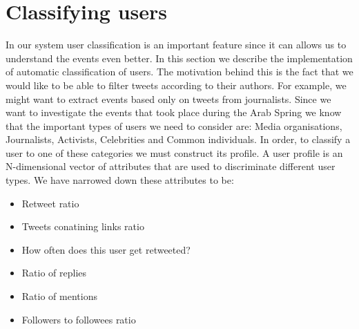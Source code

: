 \section{Classifying users}
In our system user classification is an important feature since it can allows us to understand the events even better. In this section we describe the implementation of automatic classification of users. The motivation behind this is the fact that we would like to be able to filter tweets according to their authors. For example, we might want to extract events based only on tweets from journalists. Since we want to investigate the events that took place during the Arab Spring we know that the important types of users we need to consider are: Media organisations, Journalists, Activists, Celebrities and Common individuals. In order, to classify a user to one of these categories we must construct its profile. A user profile is an N-dimensional vector of attributes that are used to discriminate different user types. We have narrowed down these attributes to be:
\begin{itemize}
  \item Retweet ratio
  \item Tweets conatining links ratio
  \item How often does this user get retweeted?
  \item Ratio of replies
  \item Ratio of mentions
  \item Followers to followees ratio 
\end{itemize}
